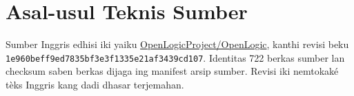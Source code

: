 \documentclass[11pt,openany,a4paper]{memoir}
\begin{document}
\chapter*{Asal-usul Teknis Sumber}
Sumber Inggris edhisi iki yaiku \href{https://github.com/OpenLogicProject/OpenLogic}{OpenLogicProject/OpenLogic},
kanthi revisi beku
\texttt{1e960beff9ed7835bf3e3f1335e21af3439cd107}.
Identitas 722 berkas sumber lan checksum saben berkas dijaga ing manifest arsip sumber.
Revisi iki nemtokaké tèks Inggris kang dadi dhasar terjemahan.


\end{document}
